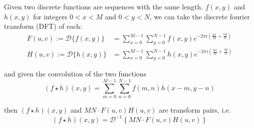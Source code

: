 \begin{theorem} 
Given two discrete functions are sequences with the same length.
$f(x,y)$ and $h(x,y)$ for integers $0 < x < M$ and $0 < y < N$, we can take the discrete fourier transform (DFT) of each:
\begin{align}
F(u,v) := \mathcal{D}\{f(x,y)\} &=
				\sum_{x=0}^{M-1} \sum_{y=0}^{N-1} f(x,y)
				e^{-2\pi i \left(\frac{ux}{M} + \frac{vy}{N}\right)} \\
H(u,v) := \mathcal{D}\{h(x,y)\} &=
				\sum_{x=0}^{M-1} \sum_{y=0}^{N-1} h(x,y)
				e^{-2\pi i \left(\frac{ux}{M} + \frac{vy}{N}\right)}
\end{align}

and given the convolution of the two functions
\begin{equation}
\left(f \star h\right)(x,y) = \sum_{m=0}^{M-1} \sum_{n=0}^{N-1} f(m,n)h(x-m,y-n)
\end{equation}

then $\left(f \star h\right)(x,y)$ and $MN\cdot F(u,v)H(u,v)$ are transform pairs, i.e.
\begin{equation}
\left(f \star h\right)(x,y) = \mathcal{D}^{-1}\left\{MN\cdot F(u,v)H(u,v)\right\}
\end{equation}
\end{theorem}


